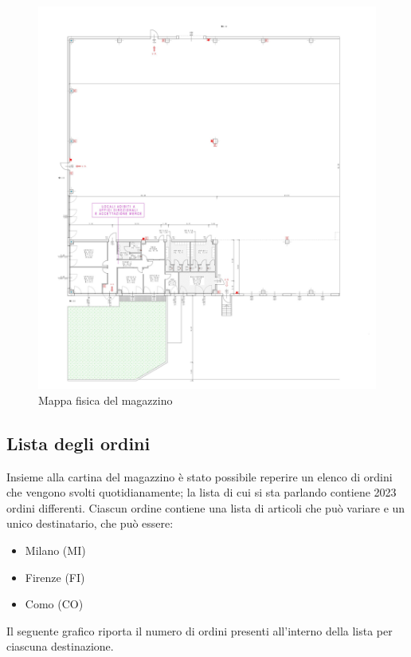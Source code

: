 \documentclass[12pt]{article}
\begin{document}
\begin{figure}
\includegraphics[width=\textwidth,height=\textheight,keepaspectratio]{Figures/Graphics/Zoom_Map.jpg}
\caption[Mappa fisica del magazzino]{Mappa fisica del magazzino}
\label{fig:Mappa_magazzino}
\end{figure}


\subsection{Lista degli ordini}
Insieme alla cartina del magazzino è stato possibile reperire un elenco di ordini che vengono svolti quotidianamente; la lista di cui si sta parlando contiene 2023 ordini differenti. Ciascun ordine contiene una lista di articoli che può variare e un unico destinatario, che può essere:
\begin{itemize}
\item Milano (MI)
\item Firenze (FI)
\item Como (CO)
\end{itemize}
Il seguente grafico riporta il numero di ordini presenti all'interno della lista per ciascuna destinazione.
\end{document}
